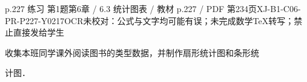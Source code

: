 \begin{bankitem}{p.227 练习 第1题}{第6章 / 6.3 统计图表 / 教材 p.227 / PDF 第234页}{XJ-B1-C06-PR-P227-Y0217}{OCR未校对：公式与文字均可能有误；未完成数学TeX转写；禁止直接发给学生}
\begin{ocrdraft}
\par
收集本班同学课外阅读图书的类型数据，并制作扇形统计图和条形统
\par
计图．
\end{ocrdraft}
\end{bankitem}
